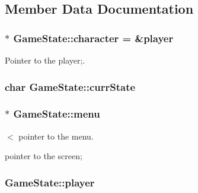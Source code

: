 \subsection{Member Data Documentation}
\hypertarget{classGameState_a925d16440517e4133b4b720b4276be58}{
\subsubsection[{character}]{$\ast$ Game\-State\-::character = \&{\bf player}\hspace{0.3cm}{\ttfamily [protected]}}}\label{classGameState_a925d16440517e4133b4b720b4276be58}


Pointer to the player;. 

\hypertarget{classGameState_a541915faaaac7068797345cce53deb9c}{
\subsubsection[{curr\-State}]{\setlength{\rightskip}{0pt plus 5cm}char Game\-State\-::curr\-State\hspace{0.3cm}{\ttfamily [protected]}}}\label{classGameState_a541915faaaac7068797345cce53deb9c}
\hypertarget{classGameState_aebc12d6e90edfbe51a571858f6288f93}{
\subsubsection[{menu}]{$\ast$ Game\-State\-::menu\hspace{0.3cm}{\ttfamily [protected]}}}\label{classGameState_aebc12d6e90edfbe51a571858f6288f93}


$<$ pointer to the menu. 

pointer to the screen; \hypertarget{classGameState_a4a951449392cb8f339fe07a7b38e3cb5}{
\subsubsection[{player}]{ Game\-State\-::player\hspace{0.3cm}{\ttfamily [protected]}}}\label{classGameState_a4a951449392cb8f339fe07a7b38e3cb5}


